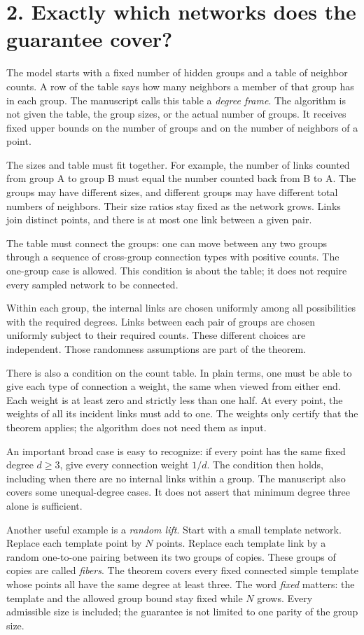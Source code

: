 \documentclass[11pt]{article}
\begin{document}
\newpage
\section*{2. Exactly which networks does the guarantee cover?}
The model starts with a fixed number of hidden groups and a table of
neighbor counts. A row of the table says how many neighbors a member
of that group has in each group. The manuscript calls this table a
\emph{degree frame}. The algorithm is not given the table, the group
sizes, or the actual number of groups. It receives fixed upper bounds
on the number of groups and on the number of neighbors of a point.

The sizes and table must fit together. For example, the number of links
counted from group A to group B must equal the number counted back
from B to A. The groups may have different sizes, and different groups
may have different total numbers of neighbors. Their size ratios stay
fixed as the network grows. Links join distinct points, and there is
at most one link between a given pair.

The table must connect the groups: one can move between any two
groups through a sequence of cross-group connection types with
positive counts. The one-group case is allowed. This condition is
about the table; it does not require every sampled network to be connected.

Within each group, the internal links are chosen uniformly among all
possibilities with the required degrees. Links between each pair of
groups are chosen uniformly subject to their required counts. These
different choices are independent. Those randomness assumptions are
part of the theorem.

There is also a condition on the count table. In plain terms, one must
be able to give each type of connection a weight, the same when viewed
from either end. Each weight is at least zero and strictly less than
one half. At every point, the weights of all its incident links must
add to one. The weights only certify that the theorem applies; the
algorithm does not need them as input.

An important broad case is easy to recognize: if every point has the
same fixed degree $d\ge3$, give every connection weight $1/d$.
The condition then holds, including when there are no internal links
within a group. The manuscript also covers some unequal-degree cases.
It does not assert that minimum degree three alone is sufficient.

Another useful example is a \emph{random lift}. Start with a small
template network. Replace each template point by $N$ points. Replace
each template link by a random one-to-one pairing between its two
groups of copies. These groups of copies are called \emph{fibers}.
The theorem covers
every fixed connected simple
template whose points all have the same degree at least three.
The word \emph{fixed} matters: the template and the allowed group
bound stay fixed while $N$ grows. Every admissible size is included;
the guarantee is not limited to one parity of the group size.
\end{document}
